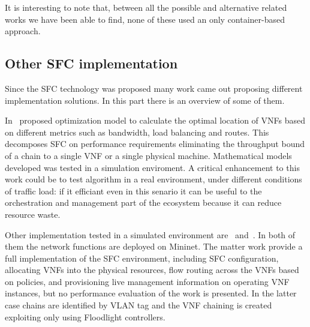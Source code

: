 \vspace{1cm}

\noindent It is interesting to note that, between all the possible and 
alternative related works we have been able to find, none of these used an only
container-based approach.

\subsection{Other SFC implementation}
Since the SFC technology was proposed many work came out proposing different implementation solutions. In this part there is an overview of some of them.

In~\cite{GhaznaviSAB16} proposed optimization model to calculate the optimal
location of VNFs based on different metrics such as bandwidth, load balancing
and routes. This decomposes SFC on performance requirements eliminating the
throughput bound of a chain to a single VNF or a single physical machine.
Mathematical models developed was tested in a simulation enviroment. A critical
enhancement to this work could be to test algorithm in a real environment, under
different conditions of traffic load: if it efficiant even in this senario it
can be useful to the orchestration and management part of the ecosystem because
it can reduce resource waste. 

Other implementation tested in a simulated environment
are~\cite{csoma2014escape} and~\cite{kim2016evaluations}. In both of them the
network functions are deployed on Mininet. The matter work provide a full
implementation of the SFC environment, including SFC configuration, allocating
VNFs into the physical resources, flow routing across the VNFs based on
policies, and provisioning live management information on operating VNF
instances, but no performance evaluation of the work is presented. In the
latter case chains are identified by VLAN tag and the VNF chaining is created
exploiting only using Floodlight controllers. 

